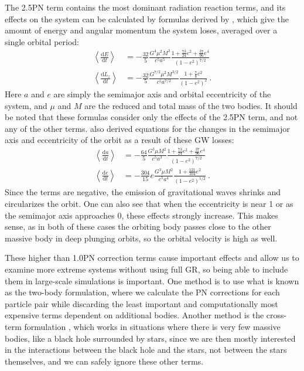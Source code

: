\documentclass[english, oneside]{HYgradu}
\begin{document}
The 2.5PN term contains the most dominant radiation reaction terms, and its effects on the system can be calculated by formulas derived by \cite{peters-mathews:1963}, which give the amount of energy and angular momentum the system loses, averaged over a single orbital period:
\begin{align}
\left< \frac{\mathrm{d} E}{\mathrm{d} t} \right> &= - \frac{32}{5} \frac{G^4 \mu^2 M^3}{c^5 a^5} \frac{1 + \frac{73}{24}e^2 + \frac{37}{96}e^4}{(1-e^2)^{7/2}} \\
\left< \frac{\mathrm{d} L_z}{\mathrm{d} t} \right> &= - \frac{32}{5} \frac{G^{7/2} \mu^2 M^{3/2}}{c^5 a^{7/2}} \frac{1 + \frac{7}{8}e^2}{(1-e^2)^2} \ .
\end{align}
Here $a$ and $e$ are simply the semimajor axis and orbital eccentricity of the system, and $\mu$ and $M$ are the reduced and total mass of the two bodies. It should be noted that these formulas consider only the effects of the 2.5PN term, and not any of the other terms. \cite{peters:1964} also derived equations for the changes in the semimajor axis and eccentricity of the orbit as a result of these GW losses:
\begin{align}
\left< \frac{\mathrm{d} a}{\mathrm{d} t} \right> &= - \frac{64}{5}\frac{G^3 \mu M^2}{c^5 a^3} \frac{1 + \frac{73}{24}e^2 + \frac{37}{96}e^4}{(1-e^2)^{7/2}} \\
\left< \frac{\mathrm{d} e}{\mathrm{d} t} \right> &= - \frac{304}{15} e \frac{G^3 \mu M^2}{c^5 a^4} \frac{1 + \frac{121}{304}e^2}{(1-e^2)^{5/2}} \ .
\end{align}
Since the terms are negative, the emission of gravitational waves shrinks and circularizes the orbit. One can also see that when the eccentricity is near 1 or as the semimajor axis approaches 0, these effects strongly increase. This makes sense, as in both of these cases the orbiting body passes close to the other massive body in deep plunging orbits, so the orbital velocity is high as well.

These higher than 1.0PN correction terms cause important effects and allow us to examine more extreme systems without using full GR, so being able to include them in large-scale simulations is important. One method is to use what is known as the two-body formulation, where we calculate the PN corrections for each particle pair while discarding the least important and computationally most expensive terms dependent on additional bodies. Another method is the cross-term formulation \citep{will:2014}, which works in situations where there is very few massive bodies, like a black hole surrounded by stars, since we are then mostly interested in the interactions between the black hole and the stars, not between the stars themselves, and we can safely ignore these other terms.
\end{document}
